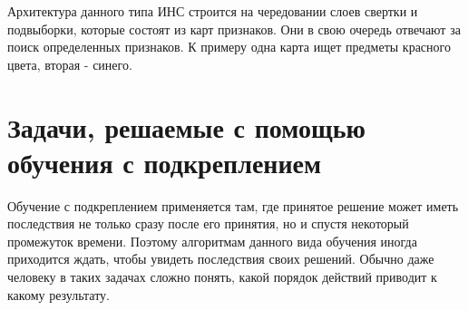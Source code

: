 \documentclass[bachelor, och, coursework]{shiza}
\begin{document}
Архитектура данного типа ИНС строится на чередовании слоев свертки и подвыборки, которые состоят из карт признаков. Они в свою очередь отвечают за поиск определенных
признаков. К примеру одна карта ищет предметы красного цвета, вторая - синего.

\section{Задачи, решаемые с помощью обучения с подкреплением}
Обучение с подкреплением применяется там, где принятое решение может иметь последствия не только сразу после его принятия,
но и спустя некоторый промежуток времени. Поэтому алгоритмам данного вида обучения иногда приходится ждать, чтобы
увидеть последствия своих решений. Обычно даже человеку в таких задачах сложно понять, какой порядок действий приводит к
какому результату.
\end{document}

